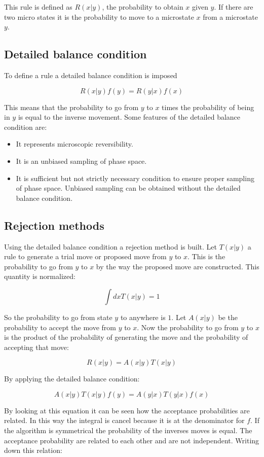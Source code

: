 This rule is defined as $R(x|y)$,  the probability to obtain $x$ given $y$.
If there are two micro states it is the probability to move to a microstate $x$ from a microstate $y$.

	\subsection{Detailed balance condition}
	To define a rule a detailed balance condition is imposed

	$$R(x|y)f(y) = R(y|x)f(x)$$

	This means that the probability to go from $y$ to $x$ times the probability of being in $y$  is equal to the inverse movement.
	Some features of the detailed balance condition are:

	\begin{itemize}
		\item It represents microscopic reversibility.
		\item It is an unbiased sampling of phase space.
		\item It is sufficient but not strictly necessary condition to ensure proper sampling of phase space.
			Unbiased sampling can be obtained without the detailed balance condition.
	\end{itemize}

	\subsection{Rejection methods}
	Using the detailed balance condition a rejection method is built.
	Let $T(x|y)$ a rule to generate a trial move or proposed move from $y$ to $x$.
	This is the probability to go from $y$ to $x$ by the way the proposed move are constructed.
	This quantity is normalized:

	$$\int dxT(x|y) = 1$$

	So the probability to go from state $y$ to anywhere is $1$.
	Let $A(x|y)$ be the probability to accept the move from $y$ to $x$.
	Now the probability to go from $y$ to $x$ is the product of the probability of generating the move and the probability of accepting that move:

	$$R(x|y) = A(x|y)T(x|y)$$

	By applying the detailed balance condition:

	$$A(x|y)T(x|y)f(y) = A(y|x)T(y|x)f(x)$$

	By looking at this equation it can be seen how the acceptance probabilities are related.
	In this way the integral is cancel because it is at the denominator for $f$.
	If the algorithm is symmetrical the probability of the inverses moves is equal.
	The acceptance probability are related to each other and are not independent.
	Writing down this relation:

